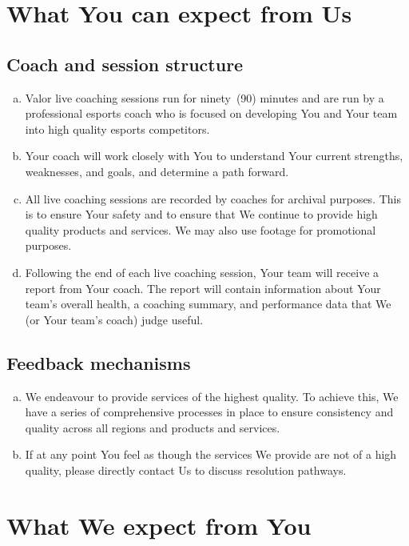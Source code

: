 \documentclass[10pt]{article}
\begin{document}
\section{What You can expect from Us}
\subsection{Coach and session structure}
\begin{enumerate}[(a)]
\item
Valor live coaching sessions run for ninety~(90) minutes and are run by a professional esports coach who is focused on developing You and Your team into high quality esports competitors.

\item
Your coach will work closely with You to understand Your current strengths, weaknesses, and goals, and determine a path forward.

\item
All live coaching sessions are recorded by coaches for archival purposes. This is to ensure Your safety and to ensure that We continue to provide high quality products and services. We may also use footage for promotional purposes.

\item
Following the end of each live coaching session, Your team will receive a report from Your coach. The report will contain information about Your team's overall health, a coaching summary, and performance data that We (or Your team's coach) judge useful.
\end{enumerate}

\subsection{Feedback mechanisms}
\begin{enumerate}[(a)]
\item
We endeavour to provide services of the highest quality. To achieve this, We have a series of comprehensive processes in place to ensure consistency and quality across all regions and products and services.

\item
If at any point You feel as though the services We provide are not of a high quality, please directly contact Us to discuss resolution pathways.
\end{enumerate}

\section{What We expect from You}
\end{document}
